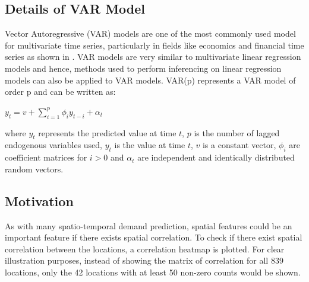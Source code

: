 \documentclass[nonblindrev,msom]{informs3} %
\begin{document}
\subsection{Details of VAR Model}
Vector Autoregressive (VAR) models are one of the most commonly used model for multivariate time series, particularly in fields like economics and financial time series as shown in \cite{Hilde2000}. VAR models are very similar to multivariate linear regression models and hence, methods used to perform inferencing on linear regression models can also be applied to VAR models. VAR(p) represents a VAR model of order p and can be written as: \\ 

\begin{center}
    $\displaystyle y_t=v+\sum_{i=1}^{p} \phi_{i}y_{t-i}+\alpha_t$
\end{center}

\noindent where $y_t$ represents the predicted value at time $t$, $p$ is the number of lagged endogenous variables used, $y_t$ is the value at time $t$, $v$ is a constant vector, $\phi_i$ are coefficient matrices for $i>0$ and $\alpha_t$ are independent and identically distributed random vectors. 

\subsection{Motivation}

As with many spatio-temporal demand prediction, spatial features could be an important feature if there exists spatial correlation. To check if there exist spatial correlation between the locations, a correlation heatmap is plotted. For clear illustration purposes, instead of showing the matrix of correlation for all 839 locations, only the 42 locations with at least 50 non-zero counts would be shown. 
\end{document}
